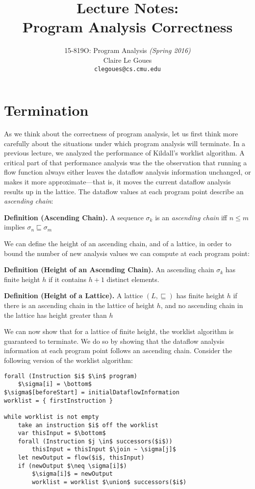 \documentclass[11pt]{article}
\title{Lecture Notes:\\
		Program Analysis Correctness}
\author{15-819O: Program Analysis \emph{(Spring 2016)} \\
        Claire Le Goues \\
		{\tt clegoues@cs.cmu.edu}}
\date{}
\newcommand{\definition}[2]
  {\bigskip \noindent
   \textbf{Definition (#1).}  #2
   \bigskip
  }
\newcommand{\join}{\sqcup}
\newcommand{\alap}{\sqsubseteq}
\begin{document}
\newtheorem{theorem}{Theorem}
\newtheorem{lemma}[theorem]{Lemma}

\maketitle

\section{Termination}

As we think about the correctness of program analysis, let us first think more carefully about the situations under which program analysis will terminate.  In a previous lecture, we analyzed the performance of Kildall's worklist algorithm.  A critical part of that performance analysis was the the observation that running a flow function always either leaves the dataflow analysis information unchanged, or makes it more approximate---that is, it moves the current dataflow analysis results up in the lattice.  The dataflow values at each program point describe an \textit{ascending chain}:

\definition{Ascending Chain}{A sequence ${\sigma_k}$ is an \textit{ascending chain} iff $n \le m$ implies $\sigma_n \alap \sigma_m$}

\noindent We can define the height of an ascending chain, and of a lattice, in order to bound the number of new analysis values we can compute at each program point:

\definition{Height of an Ascending Chain}{An ascending chain ${\sigma_k}$ has finite height $h$ if it contains $h+1$ distinct elements.}

\definition{Height of a Lattice}{A lattice $(L,\alap)$ has finite height $h$ if there is an ascending chain in the lattice of height $h$, and no ascending chain in the lattice has height greater than $h$}


We can now show that for a lattice of finite height, the worklist algorithm is guaranteed to terminate.  We do so by showing that the dataflow analysis information at each program point follows an ascending chain.  Consider the following version of the worklist algorithm:

\begin{lstlisting}[mathescape]
forall (Instruction $i$ $\in$ program)
    $\sigma[i] = \bottom$
$\sigma$[beforeStart] = initialDataflowInformation
worklist = { firstInstruction }

while worklist is not empty
    take an instruction $i$ off the worklist
	var thisInput = $\bottom$
	forall (Instruction $j \in$ successors($i$))
		thisInput = thisInput $\join ~ \sigma[j]$
    let newOutput = flow($i$, thisInput)
	if (newOutput $\neq \sigma[i]$)
		$\sigma[i]$ = newOutput
		worklist = worklist $\union$ successors($i$)
	
\end{lstlisting}
\end{document}
